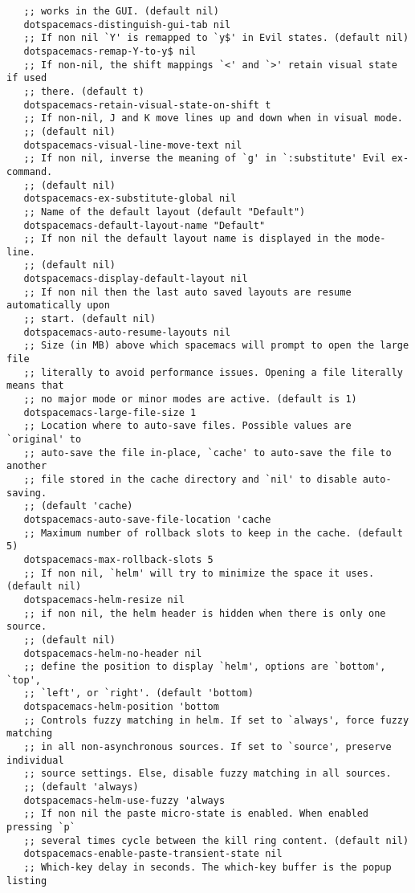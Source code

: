 \documentclass[11pt]{article}
\begin{document}
\begin{verbatim}
   ;; works in the GUI. (default nil)
   dotspacemacs-distinguish-gui-tab nil
   ;; If non nil `Y' is remapped to `y$' in Evil states. (default nil)
   dotspacemacs-remap-Y-to-y$ nil
   ;; If non-nil, the shift mappings `<' and `>' retain visual state if used
   ;; there. (default t)
   dotspacemacs-retain-visual-state-on-shift t
   ;; If non-nil, J and K move lines up and down when in visual mode.
   ;; (default nil)
   dotspacemacs-visual-line-move-text nil
   ;; If non nil, inverse the meaning of `g' in `:substitute' Evil ex-command.
   ;; (default nil)
   dotspacemacs-ex-substitute-global nil
   ;; Name of the default layout (default "Default")
   dotspacemacs-default-layout-name "Default"
   ;; If non nil the default layout name is displayed in the mode-line.
   ;; (default nil)
   dotspacemacs-display-default-layout nil
   ;; If non nil then the last auto saved layouts are resume automatically upon
   ;; start. (default nil)
   dotspacemacs-auto-resume-layouts nil
   ;; Size (in MB) above which spacemacs will prompt to open the large file
   ;; literally to avoid performance issues. Opening a file literally means that
   ;; no major mode or minor modes are active. (default is 1)
   dotspacemacs-large-file-size 1
   ;; Location where to auto-save files. Possible values are `original' to
   ;; auto-save the file in-place, `cache' to auto-save the file to another
   ;; file stored in the cache directory and `nil' to disable auto-saving.
   ;; (default 'cache)
   dotspacemacs-auto-save-file-location 'cache
   ;; Maximum number of rollback slots to keep in the cache. (default 5)
   dotspacemacs-max-rollback-slots 5
   ;; If non nil, `helm' will try to minimize the space it uses. (default nil)
   dotspacemacs-helm-resize nil
   ;; if non nil, the helm header is hidden when there is only one source.
   ;; (default nil)
   dotspacemacs-helm-no-header nil
   ;; define the position to display `helm', options are `bottom', `top',
   ;; `left', or `right'. (default 'bottom)
   dotspacemacs-helm-position 'bottom
   ;; Controls fuzzy matching in helm. If set to `always', force fuzzy matching
   ;; in all non-asynchronous sources. If set to `source', preserve individual
   ;; source settings. Else, disable fuzzy matching in all sources.
   ;; (default 'always)
   dotspacemacs-helm-use-fuzzy 'always
   ;; If non nil the paste micro-state is enabled. When enabled pressing `p`
   ;; several times cycle between the kill ring content. (default nil)
   dotspacemacs-enable-paste-transient-state nil
   ;; Which-key delay in seconds. The which-key buffer is the popup listing

\end{verbatim}
\end{document}
